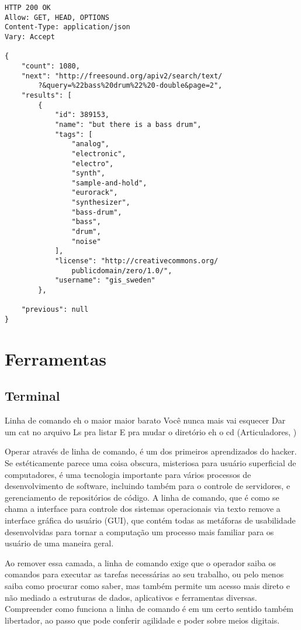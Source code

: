 \begin{verbatim}
HTTP 200 OK
Allow: GET, HEAD, OPTIONS
Content-Type: application/json
Vary: Accept

{
    "count": 1080,
    "next": "http://freesound.org/apiv2/search/text/
    	?&query=%22bass%20drum%22%20-double&page=2",
    "results": [
        {
            "id": 389153,
            "name": "but there is a bass drum",
            "tags": [
                "analog",
                "electronic",
                "electro",
                "synth",
                "sample-and-hold",
                "eurorack",
                "synthesizer",
                "bass-drum",
                "bass",
                "drum",
                "noise"
            ],
            "license": "http://creativecommons.org/
				publicdomain/zero/1.0/",
            "username": "gis_sweden"
        },
        
    "previous": null
}

\end{verbatim}



\section{Ferramentas}
\subsection{Terminal}

\begin{citacao}
Linha de comando eh o maior maior barato
Você nunca mais vai esquecer
Dar um cat no arquivo
Ls pra listar
E pra mudar o diretório eh o cd (Articuladores, )
\end{citacao}

Operar através de linha de comando, é um dos primeiros aprendizados do hacker. Se estéticamente parece uma coisa obscura, misteriosa para usuário superficial de computadores, é uma tecnologia importante para vários processos de desenvolvimento de software, incluindo também para o controle de servidores, e gerenciamento de repositórios de código. A linha de comando, que é como se chama a interface para controle dos sistemas operacionais via texto remove a interface gráfica do usuário (GUI), que contém todas as metáforas de usabilidade desenvolvidas para tornar a computação um processo mais familiar para os usuário de uma maneira geral.

Ao remover essa camada, a linha de comando exige que o operador saiba os comandos para executar as tarefas necessárias ao seu trabalho, ou pelo menos saiba como procurar como saber, mas também permite um acesso mais direto e não mediado a estruturas de dados, aplicativos e ferramentas diversas. Compreender como funciona a linha de comando é em um certo sentido também libertador, ao passo que pode conferir agilidade e poder sobre meios digitais. 

